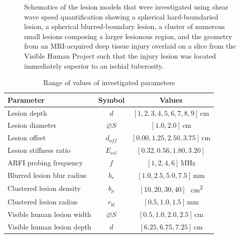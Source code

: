 \begin{figure}[!htb]
{
					\label{fig:shear_schematic_human}
				}
				\caption[Schematic of shear wave speed quantification-investigated lesions]{Schematics of the lesion models that were investigated using shear wave speed quantification showing \protect{} a spherical hard-boundaried lesion, \protect{} a spherical blurred-boundary lesion, \protect{} a cluster of numerous small lesions composing a larger lesionous region, and \protect{} the geometry from an MRI-acquired deep tissue injury overlaid on a slice from the Visible Human Project such that the injury lesion was located immediately superior to an ischial tuberosity.}	
				\label{fig:shear_schematics}
			\end{figure}

			\begin{table}[!htb]
				\centering
				\caption[Shear wave speed quantification model investigated parameters]{Range of values of investigated parameters}
				\label{tab:shear-parametervalues}
				\begin{tabular}{lcc}
					\toprule
					Parameter & Symbol & Values \\
					\midrule
					Lesion depth & $d$ & $[1, 2, 3, 4, 5, 6, 7, 8, 9]$\,\si{\cm} \\
					Lesion diameter & $\diameter S$ & $[1.0, 2.0]$\,\si{\cm} \\
					Lesion offset & $d_{off}$ & $[0.00, 1.25, 2.50, 3.75]$\,\si{\cm} \\
					Lesion stiffness ratio & $E_{rel}$ & $[0.32, 0.56, 1.80, 3.20]$ \\
					ARFI probing frequency & $f$ & $[1, 2, 4, 6]$\,\si{\MHz} \\
					Blurred lesion blur radius & $b_r$ & $[1.0, 2.5, 5.0, 7.5]$\,\si{\mm} \\
					Clustered lesion density & $b_\rho$ & $[10, 20, 30, 40]$\,\si{\per\cm\squared} \\
					Clustered lesion radius & $r_{bl}$ & $[0.5, 1.0, 1.5]$\,\si{\mm} \\
					Visible human lesion width & $\diameter S$ & $[0.5, 1.0, 2.0, 2.5]$\,\si{\cm} \\
					Visible human lesion depth & $d$ & $[6.25, 6.75, 7.25]$\,\si{\cm} \\
					\bottomrule
				\end{tabular}
			\end{table}

